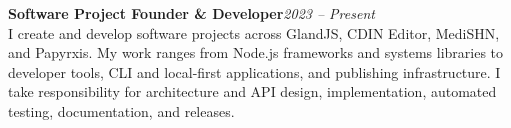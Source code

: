 \textbf{Software Project Founder \& Developer}\hfill\textit{2023 -- Present}\\[1pt]
I create and develop software projects across GlandJS, CDIN Editor, MediSHN, and Papyrxis. My work ranges from Node.js frameworks and systems libraries to developer tools, CLI and local-first applications, and publishing infrastructure. I take responsibility for architecture and API design, implementation, automated testing, documentation, and releases.

